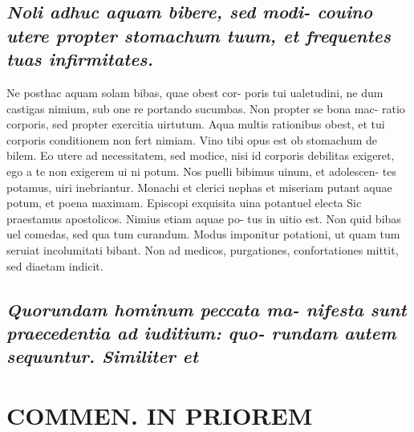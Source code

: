 \documentclass{article}
\begin{document}
\begin{pages}
\subsection*{\textit{Noli adhuc aquam bibere, sed modi- couino utere propter stomachum tuum, et frequentes tuas infirmitates. }}\pstart Ne posthac aquam solam bibas, quae obest cor- poris tui ualetudini, ne dum castigas nimium, sub one re portando sucumbas. Non propter se bona mac- ratio corporis, sed propter exercitia uirtutum. Aqua multis rationibus obest, et tui corporis conditionem non fert nimiam. Vino tibi opus est ob stomachum de bilem. Eo utere ad necessitatem, sed modice, nisi id corporis debilitas exigeret, ego a te non exigerem ui ni potum. Nos puelli bibimus uinum, et adolescen- tes potamus, uiri inebriantur. Monachi et clerici nephas et miseriam putant aquae potum, et poena maximam. Episcopi exquisita uina potantuel electa Sic praestamus apostolicos. Nimius etiam aquae po- tus in uitio est. Non quid bibas uel comedas, sed qua tum curandum. Modus imponitur potationi, ut quam tum seruiat incolumitati bibant. Non ad medicos, purgationes, confortationes mittit, sed diaetam indicit.  \pend
{}
{}
\subsection*{\textit{Quorundam hominum peccata ma- nifesta sunt praecedentia ad iuditium: quo- rundam autem sequuntur. Similiter et }}
\section*{COMMEN. IN PRIOREM }
\marginpar{[ p.150 ]}
{}

\end{pages}
\end{document}
